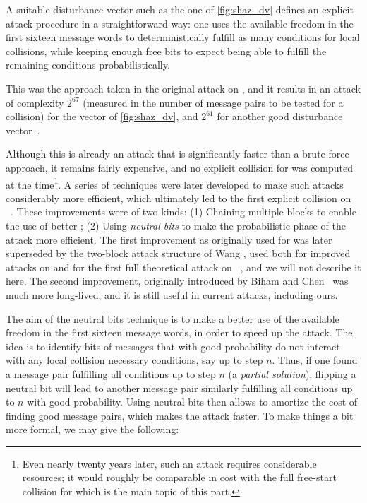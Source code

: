 A suitable disturbance vector such as the one of \autoref{fig:shaz_dv} defines an explicit attack procedure in a straightforward way: one uses the available freedom in the first
sixteen message words to deterministically fulfill as many conditions for local collisions, while keeping enough free bits to expect being able to fulfill the remaining conditions
probabilistically.

This was the approach taken in the original attack on \shazero, and it results in an attack of complexity $2^{67}$ (measured in the number of message pairs to be tested for a collision)
for the vector of \autoref{fig:shaz_dv}, and $2^{61}$ for another good disturbance vector~\cite{DBLP:conf/crypto/ChabaudJ98}.

Although this is already an attack that is significantly faster than a brute-force approach, it remains fairly expensive, and no explicit collision for \shazero was computed at the time\footnote{Even
nearly twenty years later, such an attack requires considerable resources; it would roughly be comparable in cost with the full free-start collision for \shaone which is the main topic of
this part.}.
A series of techniques were later developed to make such attacks considerably more efficient, which ultimately led to the first explicit collision on \shazero~\cite{DBLP:conf/eurocrypt/BihamCJCLJ05}.
These improvements were of two kinds: (1) Chaining multiple blocks to enable the use of better \dvs; (2) Using \emph{neutral bits} to make the probabilistic phase of the attack more efficient.
The first improvement as originally used for \shazero was later superseded by the two-block attack structure of Wang \etal, used both for improved attacks on \shazero
and for the first full theoretical attack on \shaone~\cite{DBLP:conf/crypto/WangYY05,DBLP:conf/crypto/WangYY05a},
and we will not describe it here. The second improvement,
originally introduced by Biham and Chen~\cite{DBLP:conf/crypto/BihamC04} was much more long-lived, and it is still useful in current attacks, including ours.

The aim of the neutral bits technique is to make a better use of the available freedom in the first sixteen message words, in order to speed up the attack. The idea is to identify bits
of messages that with good probability do not interact with any local collision necessary conditions, say up to step $n$. Thus, if one found a message pair fulfilling all conditions
up to step $n$ (a \emph{partial solution}), flipping a neutral bit will lead to another message pair similarly fulfilling all conditions up to $n$ with good probability. Using neutral bits then allows to amortize
the cost of finding good message pairs, which makes the attack faster. To make things a bit more formal, we may give the following:

